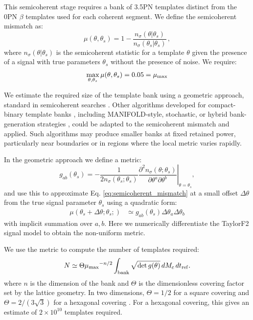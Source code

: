 \documentclass[aps,prd,amsmath,floats,floatfix, twocolumn,
superscriptaddress,nofootinbib,showpacs]{revtex4-2}
\begin{document}
This semicoherent stage requires a bank of 3.5PN templates distinct from the 0PN $\beta$ templates used for each coherent segment. We define the semicoherent mismatch as:
\begin{equation}
    \mu(\theta, \theta_s) = 1-\frac{n_\sigma(\theta|\theta_s)}{n_\sigma(\theta_s|\theta_s)} \, , \label{eq:semicoherent_mismatch}
\end{equation}
where $n_\sigma(\theta|\theta_s)$ is the semicoherent statistic for a template $\theta$ given the presence of a signal with true parameters $\theta_s$ without the presence of noise. We require:
\begin{equation}
    \max_{\theta, \theta_s}\mu(\theta, \theta_s) = 0.05 = \mu_{\rm max} \label{eq:semicoherent_mismatch_max}
\end{equation}

We estimate the required size of the template bank using a geometric approach, standard in semicoherent searches \cite{Prix:2007ks,Wette:2014tca}. Other algorithms developed for
compact-binary template banks \cite{Brown:2012nn}, including
MANIFOLD-style, stochastic, or hybrid bank-generation strategies
\cite{Hanna:2022zpk,Hanna:2024tom,Kacanja:2024pjh,Roy:2017oul,Roy:2017qgg},
could be adapted to the semicoherent mismatch and applied.  Such algorithms may
produce smaller banks at fixed retained power, particularly near boundaries or
in regions where the local metric varies rapidly. 

In the geometric approach we define a metric:
\begin{equation}
g_{ab}(\theta_s)
=
-\frac{1}{2n_\sigma(\theta_s;\theta_s)}
\left.
\frac{\partial^2 n_\sigma(\theta;\theta_s)}
{\partial\theta^a\partial\theta^b}
\right|_{\theta=\theta_s} ,
\label{eq:semicoherent_metric_tensor}
\end{equation}
and use this to approximate Eq. \ref{eq:semicoherent_mismatch} at a small offset $\Delta\theta$ from the true signal parameter $\theta_s$ using a quadratic form: 
\begin{align}
\mu(\theta_s+\Delta\theta;\theta_s;)
&\simeq  g_{ab}(\theta_s)\Delta\theta_a\Delta\theta_b
\label{eq:semicoherent_metric_expansion}
\end{align}
with implicit summation over $a, b$. Here we numerically differentiate the TaylorF2
signal model to obtain the non-uniform metric. 

We use the metric to compute the number of templates required:
\begin{equation}
    N \simeq \Theta
    {\mu_{\max}}^{-n/2}
    \int_{\rm bank}
    \sqrt{\det g(\theta)}
    \,dM_c\,dt_{\rm ref}.
    \label{eq:standard_template_count}
\end{equation}
where $n$ is the dimension of the bank and $\Theta$ is the dimensionless
covering factor set by the lattice geometry.  In two dimensions,
$\Theta=1/2$ for a square covering and
$\Theta=2/(3\sqrt{3})$ for a hexagonal covering \cite{Jaranowski:2005hz}. For a hexagonal covering, this gives
an estimate of $2\times 10^{10}$ templates required. 
\end{document}
